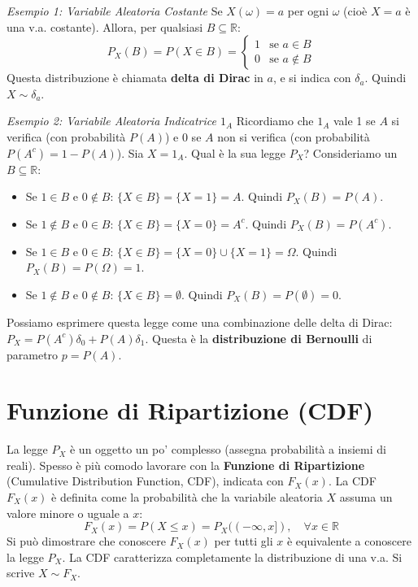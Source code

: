\textit{Esempio 1: Variabile Aleatoria Costante}
Se $X(\omega) = a$ per ogni $\omega$ (cioè $X=a$ è una v.a. costante).
Allora, per qualsiasi $B \subseteq \mathbb{R}$:
\[ P_X(B) = P(X \in B) = \begin{cases} 1 & \text{se } a \in B \\ 0 & \text{se } a \notin B \end{cases} \]
Questa distribuzione è chiamata \textbf{delta di Dirac} in $a$, e si indica con $\delta_a$. Quindi $X \sim \delta_a$.

\textit{Esempio 2: Variabile Aleatoria Indicatrice $1_A$}
Ricordiamo che $1_A$ vale 1 se $A$ si verifica (con probabilità $P(A)$) e 0 se $A$ non si verifica (con probabilità $P(A^c) = 1-P(A)$).
Sia $X = 1_A$. Qual è la sua legge $P_X$?
Consideriamo un $B \subseteq \mathbb{R}$:
\begin{itemize}
    \item Se $1 \in B$ e $0 \notin B$: $\{X \in B\} = \{X=1\} = A$. Quindi $P_X(B) = P(A)$.
    \item Se $1 \notin B$ e $0 \in B$: $\{X \in B\} = \{X=0\} = A^c$. Quindi $P_X(B) = P(A^c)$.
    \item Se $1 \in B$ e $0 \in B$: $\{X \in B\} = \{X=0\} \cup \{X=1\} = \Omega$. Quindi $P_X(B) = P(\Omega) = 1$.
    \item Se $1 \notin B$ e $0 \notin B$: $\{X \in B\} = \emptyset$. Quindi $P_X(B) = P(\emptyset) = 0$.
\end{itemize}
Possiamo esprimere questa legge come una combinazione delle delta di Dirac:
$P_X = P(A^c) \delta_0 + P(A) \delta_1$.
Questa è la \textbf{distribuzione di Bernoulli} di parametro $p=P(A)$.

\section{Funzione di Ripartizione (CDF)}
La legge $P_X$ è un oggetto un po' complesso (assegna probabilità a insiemi di reali). Spesso è più comodo lavorare con la \textbf{Funzione di Ripartizione} (Cumulative Distribution Function, CDF), indicata con $F_X(x)$.
La CDF $F_X(x)$ è definita come la probabilità che la variabile aleatoria $X$ assuma un valore minore o uguale a $x$:
\[ F_X(x) = P(X \le x) = P_X((-\infty, x]), \quad \forall x \in \mathbb{R} \]
Si può dimostrare che conoscere $F_X(x)$ per tutti gli $x$ è equivalente a conoscere la legge $P_X$. La CDF caratterizza completamente la distribuzione di una v.a. Si scrive $X \sim F_X$.

